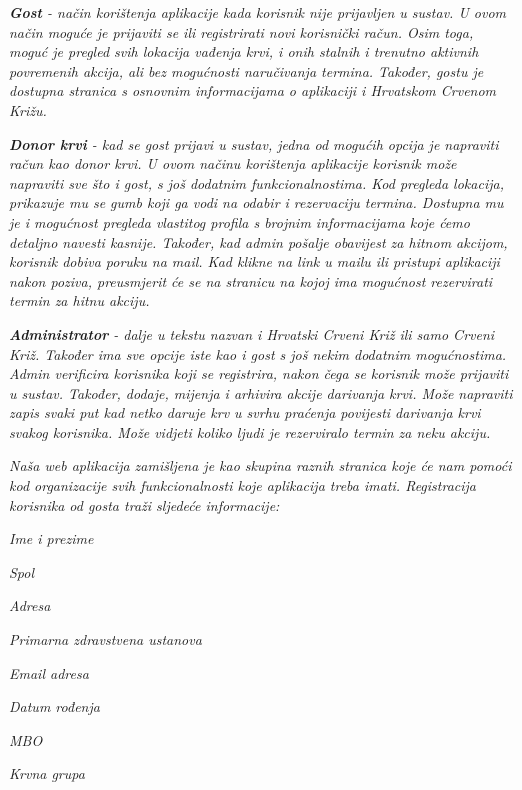 		\begin{packed_item}
				\item \textit{\textbf{Gost} - način korištenja aplikacije kada korisnik nije prijavljen u sustav. U ovom način moguće je prijaviti se ili registrirati novi korisnički račun. Osim toga, moguć je pregled svih lokacija vađenja krvi, i onih stalnih i trenutno aktivnih povremenih akcija, ali bez mogućnosti naručivanja termina. Također, gostu je dostupna stranica s osnovnim informacijama o aplikaciji i Hrvatskom Crvenom Križu.}
				\item \textit{\textbf{Donor krvi} - kad se gost prijavi u sustav, jedna od mogućih opcija je napraviti račun kao donor krvi. U ovom načinu korištenja aplikacije korisnik može napraviti sve što i gost, s još dodatnim funkcionalnostima. Kod pregleda lokacija, prikazuje mu se gumb koji ga vodi na odabir i rezervaciju termina. Dostupna mu je i mogućnost pregleda vlastitog profila s brojnim informacijama koje ćemo detaljno navesti kasnije. Također, kad admin pošalje obavijest za hitnom akcijom, korisnik dobiva poruku na mail. Kad klikne na link u mailu ili pristupi aplikaciji nakon poziva, preusmjerit će se na stranicu na kojoj ima mogućnost rezervirati termin za hitnu akciju.}
				\item \textit{\textbf{Administrator} - dalje u tekstu nazvan i Hrvatski Crveni Križ ili samo Crveni Križ. Također ima sve opcije iste kao i gost s još nekim dodatnim mogućnostima. Admin verificira korisnika koji se registrira, nakon čega se korisnik može prijaviti u sustav. Također, dodaje, mijenja i arhivira akcije darivanja krvi. Može napraviti zapis svaki put kad netko daruje krv u svrhu praćenja povijesti darivanja krvi svakog korisnika. Može vidjeti koliko ljudi je rezerviralo termin za neku akciju.}
		\end{packed_item}

		\textit{Naša web aplikacija zamišljena je kao skupina raznih stranica koje će nam pomoći kod organizacije svih funkcionalnosti koje aplikacija treba imati. Registracija korisnika od gosta traži sljedeće informacije:}

		\begin{packed_item}
				\item \textit{Ime i prezime}
				\item \textit{Spol}
				\item \textit{Adresa}
				\item \textit{Primarna zdravstvena ustanova}
				\item \textit{Email adresa}
				\item \textit{Datum rođenja}
				\item \textit{MBO}
				\item \textit{Krvna grupa}
		\end{packed_item}

